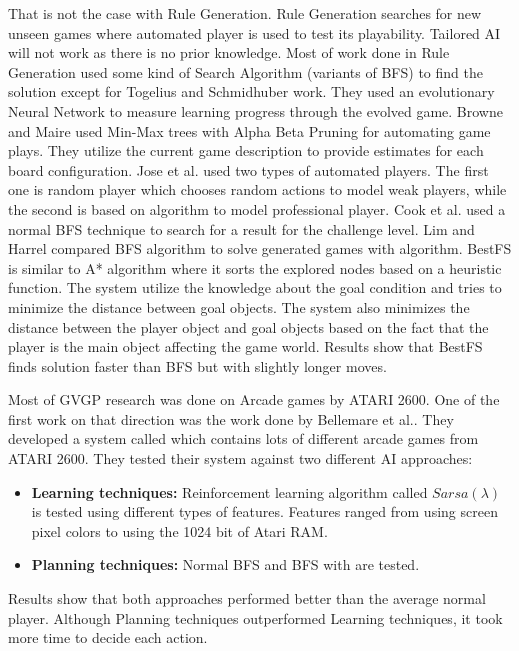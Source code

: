 That is not the case with Rule Generation. Rule Generation searches for new unseen games where automated player is used to test its playability. Tailored AI will not work as there is no prior knowledge. Most of work done in Rule Generation used some kind of Search Algorithm (variants of BFS) to find the solution except for Togelius and Schmidhuber\cite{arcadeHillClimber} work. They used an evolutionary Neural Network to measure learning progress through the evolved game. Browne and Maire\cite{evolveBrowne} used Min-Max trees with Alpha Beta Pruning for automating game plays. They utilize the current game description to provide estimates for each board configuration. Jose et al.\cite{generationCardGames} used two types of automated players. The first one is random player which chooses random actions to model weak players, while the second is based on  algorithm to model professional player. Cook et al.\cite{mechanicMiner} used a normal BFS technique to search for a result for the challenge level. Lim and Harrel\cite{puzzleScriptGeneration} compared BFS algorithm to solve generated games with  algorithm. BestFS is similar to A* algorithm where it sorts the explored nodes based on a heuristic function. The system utilize the knowledge about the goal condition and tries to minimize the distance between goal objects. The system also minimizes the distance between the player object and goal objects based on the fact that the player is the main object affecting the game world. Results show that BestFS finds solution faster than BFS but with slightly longer moves.\\\par

Most of GVGP research was done on Arcade games by ATARI 2600. One of the first work on that direction was the work done by Bellemare et al.\cite{arcadeLearningEnviroment}. They developed a system called  which contains lots of different arcade games from ATARI 2600. They tested their system against two different AI approaches:
\begin{itemize} \itemsep0pt \parskip0pt 
	\item \textbf{Learning techniques:} Reinforcement learning algorithm called $Sarsa(\lambda)$ is tested using different types of features. Features ranged from using screen pixel colors to using the 1024 bit of Atari RAM.
	\item \textbf{Planning techniques:} Normal BFS and BFS with  are tested.
\end{itemize}
Results show that both approaches performed better than the average normal player. Although Planning techniques outperformed Learning techniques, it took more time to decide each action.\\\par

